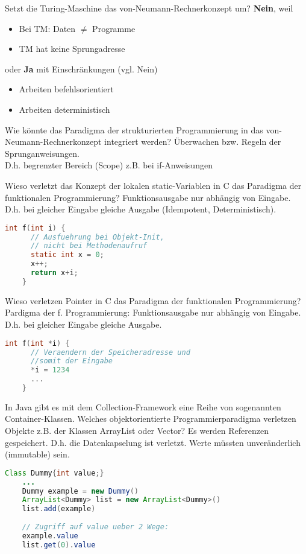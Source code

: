 \begin{card}
	Setzt die Turing-Maschine das von-Neumann-Rechnerkonzept um?
	\hr
	\textbf{Nein}, weil
	\begin{itemize}
	\item Bei TM: Daten $\neq$ Programme
	\item TM hat keine Sprungadresse
	\end{itemize}
	\vfill
	oder \textbf{Ja} mit Einschränkungen (vgl. Nein)
	\begin{itemize}
	\item Arbeiten befehlsorientiert
	\item Arbeiten deterministisch
	\end{itemize}
\end{card}

\begin{card}
	Wie könnte das Paradigma der strukturierten Programmierung in das von-Neumann-Rechnerkonzept integriert werden?
	\hr
	Überwachen bzw. Regeln der Sprunganweisungen.\\
	D.h. begrenzter Bereich (Scope) z.B. bei if-Anweisungen
\end{card}

\begin{card}
	Wieso verletzt das Konzept der lokalen static-Variablen in C das Paradigma der funktionalen
	Programmierung?
	\hr
	Funktionsausgabe nur abhängig von Eingabe. D.h. bei gleicher Eingabe gleiche Ausgabe (Idempotent, Deterministisch).
	\begin{lstlisting}[language=C]
	int f(int i) {
	  // Ausfuehrung bei Objekt-Init, 
	  // nicht bei Methodenaufruf
	  static int x = 0; 
	  x++;
	  return x+i;
	}
	\end{lstlisting}	
\end{card}

\begin{card}
	Wieso verletzen Pointer in C das Paradigma der funktionalen Programmierung?
	\hr
	Pardigma der f. Programmierung: Funktionsausgabe nur abhängig von Eingabe.  D.h. bei gleicher Eingabe gleiche Ausgabe.
	\begin{lstlisting}[language=C]
	int f(int *i) {
	  // Veraendern der Speicheradresse und 
	  //somit der Eingabe
	  *i = 1234
	  ...
	}
	\end{lstlisting}	
\end{card}

\begin{card}
	In Java gibt es mit dem Collection-Framework eine Reihe von sogenannten Container-Klassen. Welches objektorientierte Programmierparadigma verletzen Objekte z.B. der Klassen	ArrayList oder Vector? 
	\hr
	Es werden Referenzen gespeichert. D.h. die Datenkapselung ist verletzt. Werte müssten unveränderlich (immutable) sein.
	\begin{lstlisting}[language=Java]
	Class Dummy{int value;}
	...
	Dummy example = new Dummy()
	ArrayList<Dummy> list = new ArrayList<Dummy>()
	list.add(example)
	
	// Zugriff auf value ueber 2 Wege:
	example.value
	list.get(0).value
	\end{lstlisting}	
\end{card}

